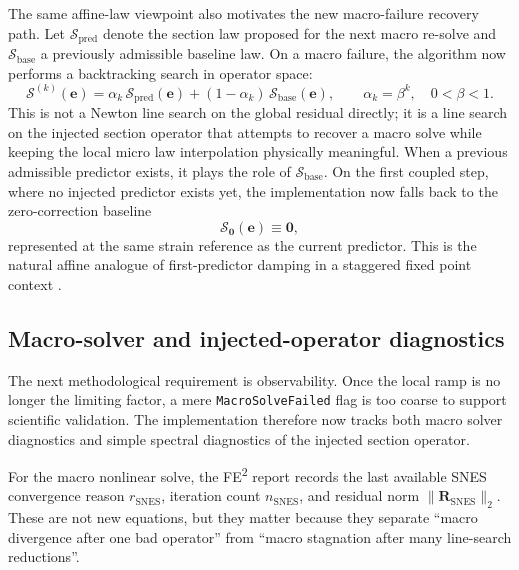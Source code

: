 The same affine-law viewpoint also motivates the new macro-failure recovery
path.  Let \(\mathcal{S}_{\mathrm{pred}}\) denote the section law proposed for
the next macro re-solve and \(\mathcal{S}_{\mathrm{base}}\) a previously
admissible baseline law.  On a macro failure, the algorithm now performs a
backtracking search in operator space:
\begin{equation}
  \mathcal{S}^{(k)}(\mathbf{e})
  = \alpha_k\,\mathcal{S}_{\mathrm{pred}}(\mathbf{e})
   + (1-\alpha_k)\,\mathcal{S}_{\mathrm{base}}(\mathbf{e}),
  \qquad
  \alpha_k = \beta^k,
  \quad 0 < \beta < 1.
  \label{eq:ms-pub-affine-backtracking}
\end{equation}
This is not a Newton line search on the global residual directly; it is a
line search on the injected section operator that attempts to recover a macro
solve while keeping the local micro law interpolation physically meaningful.
When a previous admissible predictor exists, it plays the role of
\(\mathcal{S}_{\mathrm{base}}\).  On the first coupled step, where no injected
predictor exists yet, the implementation now falls back to the zero-correction
baseline
\begin{equation}
  \mathcal{S}_{\mathbf{0}}(\mathbf{e}) \equiv \mathbf{0},
  \label{eq:ms-pub-zero-baseline}
\end{equation}
represented at the same strain reference as the current predictor.  This is
the natural affine analogue of first-predictor damping in a staggered fixed
point context \cite{Kelley1995,Deuflhard2011}.

\subsection{Macro-solver and injected-operator diagnostics}
\label{sec:ms-pub-macro-diagnostics}

The next methodological requirement is observability.  Once the local ramp is
no longer the limiting factor, a mere \texttt{MacroSolveFailed} flag is too
coarse to support scientific validation.  The implementation therefore now
tracks both macro solver diagnostics and simple spectral diagnostics of the
injected section operator.

For the macro nonlinear solve, the FE\textsuperscript{2} report records the
last available SNES convergence reason \(r_{\mathrm{SNES}}\), iteration count
\(n_{\mathrm{SNES}}\), and residual norm
\(\lVert \mathbf{R}_{\mathrm{SNES}}\rVert_2\).  These are not new equations,
but they matter because they separate ``macro divergence after one bad
operator'' from ``macro stagnation after many line-search reductions''.

